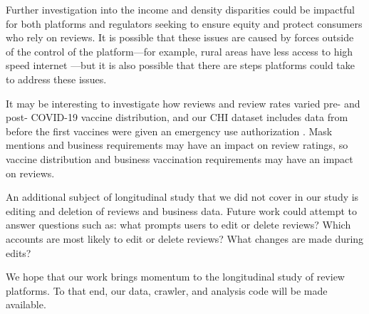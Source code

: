 Further investigation into the income and density disparities could be impactful for both platforms and regulators seeking to ensure equity and protect consumers who rely on reviews. It is possible that these issues are caused by forces outside of the control of the platform---for example, rural areas have less access to high speed internet \cite{fcc2020broadband}---but it is also possible that there are steps platforms could take to address these issues.

It may be interesting to investigate how reviews and review rates varied pre- and post- COVID-19 vaccine distribution, and our CHI dataset includes data from before the first vaccines were given an emergency use authorization \cite{nature2020moderna}. Mask mentions and business requirements may have an impact on review ratings, so vaccine distribution and business vaccination requirements may have an impact on reviews.

An additional subject of longitudinal study that we did not cover in our study is editing and deletion of reviews and business data. Future work could attempt to answer questions such as: what prompts users to edit or delete reviews? Which accounts are most likely to edit or delete reviews? What changes are made during edits?

We hope that our work brings momentum to the longitudinal study of review platforms. To that end, our data, crawler, and analysis code will be made available.